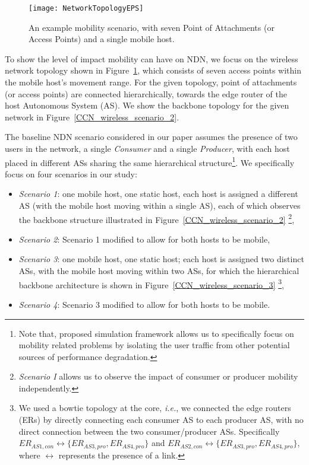 \documentclass[conference]{IEEEtran}
\begin{document}
\begin{figure}
  \centering
\texttt{[image: NetworkTopologyEPS]}\\
  \caption{An example mobility scenario, with seven Point of Attachments (or Access Points) and a single mobile host.}\label{CCN_wireless_scenario_1}
\end{figure}

To show the level of impact mobility can have on NDN, we focus on the wireless network topology shown in Figure~\ref{CCN_wireless_scenario_1}, which consists of seven access points within the mobile host's movement range. For the given topology, point of attachments (or access points) are connected hierarchically, towards the edge router of the host Autonomous System (AS). We show the backbone topology for the given network in Figure~\ref{CCN_wireless_scenario_2}.

The baseline NDN scenario considered in our paper assumes the presence of two users in the network, a single \emph{Consumer} and a single \emph{Producer}, with each host placed in different ASs sharing the same hierarchical structure\footnote{Note that, proposed simulation framework allows us to specifically focus on mobility related problems by isolating the user traffic from other potential sources of performance degradation.}. We specifically focus on four scenarios in our study:
\begin{itemize}
\item \emph{Scenario 1}: one mobile host, one static host, each host is assigned a different AS (with the mobile host moving within a single AS), each of which observes the backbone structure illustrated in Figure~\ref{CCN_wireless_scenario_2} \footnote{\emph{Scenario I} allows us to observe the impact of consumer or producer mobility independently.},
\item \emph{Scenario 2}: Scenario 1 modified to allow for both hosts to be mobile,
\item \emph{Scenario 3}: one mobile host, one static host; each host is assigned two distinct ASs, with the mobile host moving within two ASs, for which the hierarchical backbone architecture is shown in Figure~\ref{CCN_wireless_scenario_3} \footnote{We used a bowtie topology at the core, \emph{i.e.}, we connected the edge routers (ERs) by directly connecting each consumer AS to each producer AS, with no direct connection between the two consumer/producer ASs. Specifically $ER_{AS1,con}\leftrightarrow\{ER_{AS3,pro},ER_{AS4,pro}\}$ and $ER_{AS2,con}\leftrightarrow\{ER_{AS3,pro},ER_{AS4,pro}\}$, where $\leftrightarrow$ represents the presence of a link.},
\item \emph{Scenario 4}: Scenario 3 modified to allow for both hosts to be mobile.
\end{itemize}
\end{document}
